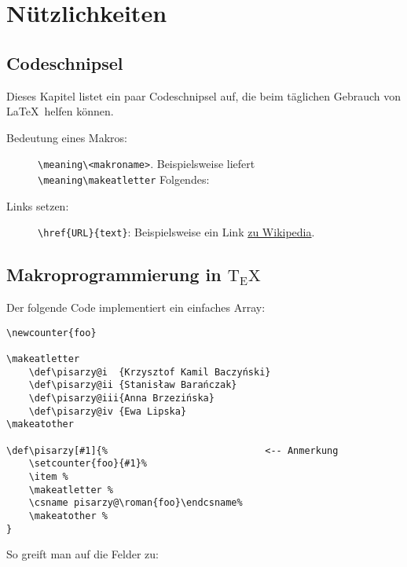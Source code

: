 	\chapter{Nützlichkeiten}
		\section{Codeschnipsel}
			Dieses Kapitel listet ein paar Codeschnipsel auf, die beim täglichen Gebrauch von \LaTeX\ helfen können.
			\begin{description}
				\item[Bedeutung eines Makros:]
					\verb|\meaning\<makroname>|. Beispielsweise liefert\\\verb|\meaning\makeatletter| Folgendes: \texttt{\meaning\makeatletter}
				\item[Links setzen:]
					\verb|\href{URL}{text}|: Beispielsweise ein Link \href{https://de.wikipedia.org/wiki/LaTeX}{zu Wikipedia}.
			\end{description}
			
		\section{Makroprogrammierung in ${\mathrm {T\!_{\displaystyle E}\!X}}$}
			Der folgende Code implementiert ein einfaches Array:
			\begin{verbatim}
\newcounter{foo}

\makeatletter
    \def\pisarzy@i 	{Krzysztof Kamil Baczyński}
    \def\pisarzy@ii	{Stanisław Barańczak}
    \def\pisarzy@iii{Anna Brzezińska}
    \def\pisarzy@iv {Ewa Lipska}
\makeatother

\def\pisarzy[#1]{%                            <-- Anmerkung
    \setcounter{foo}{#1}%
    \item %
    \makeatletter %
    \csname pisarzy@\roman{foo}\endcsname%
    \makeatother %
}
			\end{verbatim}
			
			\makeatletter
				\def\pisarzy@i 	{Krzysztof Kamil Baczyński}
				\def\pisarzy@ii	{Stanisław Barańczak}
				\def\pisarzy@iii{Anna Brzezińska}
				\def\pisarzy@iv {Ewa Lipska}
			\makeatother
			
			\def\pisarzy[#1]{%
				\setcounter{foo}{#1}%
				\item %
				\makeatletter %
				\csname pisarzy@\roman{foo}\endcsname%
				\makeatother %
			}
			
			\newpage
			So greift man auf die Felder zu: 
			
